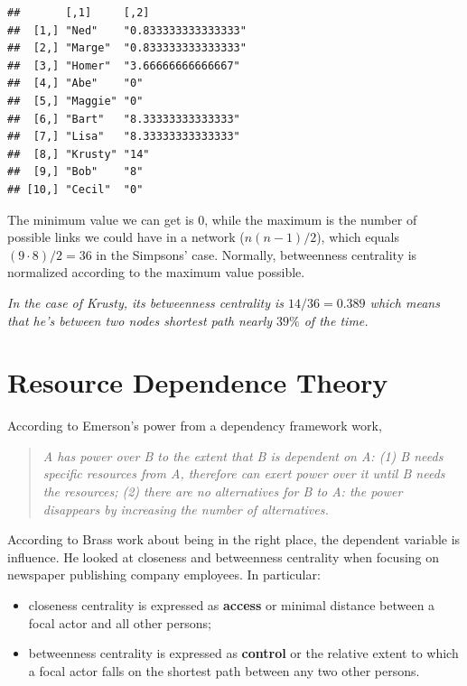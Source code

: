 \documentclass[
  notitlepage,
  onecolumn,
  openany]{book}
\providecommand{\tightlist}{%
  \setlength{\itemsep}{0pt}\setlength{\parskip}{0pt}}
\begin{document}
\begin{verbatim}
##       [,1]     [,2]               
##  [1,] "Ned"    "0.833333333333333"
##  [2,] "Marge"  "0.833333333333333"
##  [3,] "Homer"  "3.66666666666667" 
##  [4,] "Abe"    "0"                
##  [5,] "Maggie" "0"                
##  [6,] "Bart"   "8.33333333333333" 
##  [7,] "Lisa"   "8.33333333333333" 
##  [8,] "Krusty" "14"               
##  [9,] "Bob"    "8"                
## [10,] "Cecil"  "0"
\end{verbatim}

The minimum value we can get is 0, while the maximum is the number of possible links we could have in a network (\(n(n-1)/2\)), which equals \((9\cdot 8)/2 = 36\) in the Simpsons' case. Normally, betweenness centrality is normalized according to the maximum value possible.

\emph{In the case of Krusty, its betweenness centrality is \(14/36 = 0.389\) which means that he's between two nodes shortest path nearly \(39\%\) of the time.}

\hypertarget{resource-dependence-theory}{%
\section{Resource Dependence Theory}\label{resource-dependence-theory}}

According to Emerson's power from a dependency framework work,

\begin{quote}
\emph{A has power over B to the extent that B is dependent on A:
(1) B needs specific resources from A, therefore can exert power over it until B needs the resources;
(2) there are no alternatives for B to A: the power disappears by increasing the number of alternatives.}
\end{quote}

According to Brass work about being in the right place, the dependent variable is influence. He looked at closeness and betweenness centrality when focusing on newspaper publishing company employees. In particular:

\begin{itemize}
\tightlist
\item
  closeness centrality is expressed as \textbf{access} or minimal distance between a focal actor and all other persons;
\item
  betweenness centrality is expressed as \textbf{control} or the relative extent to which a focal actor falls on the shortest path between any two other persons.
\end{itemize}
\end{document}

